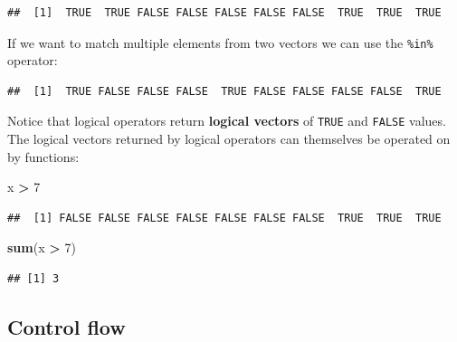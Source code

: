 \documentclass[
]{book}
\newenvironment{Shaded}{\begin{snugshade}}{\end{snugshade}}
\newcommand{\CommentTok}[1]{\textcolor[rgb]{0.56,0.35,0.01}{\textit{#1}}}
\newcommand{\DecValTok}[1]{\textcolor[rgb]{0.00,0.00,0.81}{#1}}
\newcommand{\KeywordTok}[1]{\textcolor[rgb]{0.13,0.29,0.53}{\textbf{#1}}}
\newcommand{\NormalTok}[1]{#1}
\newcommand{\OperatorTok}[1]{\textcolor[rgb]{0.81,0.36,0.00}{\textbf{#1}}}
\newcommand{\StringTok}[1]{\textcolor[rgb]{0.31,0.60,0.02}{#1}}
\begin{document}
\begin{verbatim}
##  [1]  TRUE  TRUE FALSE FALSE FALSE FALSE FALSE  TRUE  TRUE  TRUE
\end{verbatim}

If we want to match multiple elements from two vectors we can use the \texttt{\%in\%} operator:

\begin{Shaded}
\end{Shaded}

\begin{verbatim}
##  [1]  TRUE FALSE FALSE FALSE  TRUE FALSE FALSE FALSE FALSE  TRUE
\end{verbatim}

Notice that logical operators return \textbf{logical vectors} of \texttt{TRUE} and \texttt{FALSE} values.
The logical vectors returned by logical operators can themselves be operated on by functions:

\begin{Shaded}
\begin{Highlighting}[]
\NormalTok{x }\OperatorTok{>}\StringTok{ }\DecValTok{7}
\end{Highlighting}
\end{Shaded}

\begin{verbatim}
##  [1] FALSE FALSE FALSE FALSE FALSE FALSE FALSE  TRUE  TRUE  TRUE
\end{verbatim}

\begin{Shaded}
\begin{Highlighting}[]
\KeywordTok{sum}\NormalTok{(x }\OperatorTok{>}\StringTok{ }\DecValTok{7}\NormalTok{)}
\end{Highlighting}
\end{Shaded}

\begin{verbatim}
## [1] 3
\end{verbatim}

\hypertarget{control-flow}{%
\subsection{Control flow}\label{control-flow}}
\end{document}
